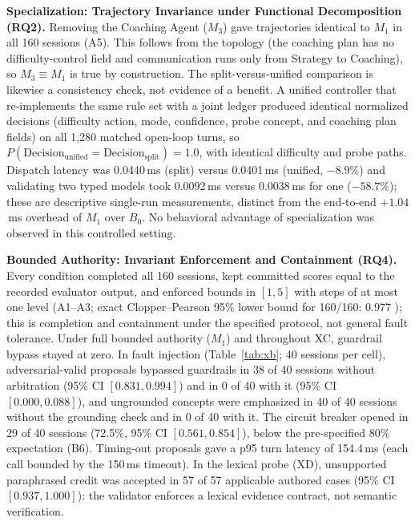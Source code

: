 \documentclass[runningheads,a4paper]{llncs}
\begin{document}
\textbf{Specialization: Trajectory Invariance under Functional Decomposition (RQ2).} Removing the Coaching Agent ($M_3$) gave trajectories identical to $M_1$ in all 160 sessions (A5). This follows from the topology (the coaching plan has no difficulty-control field and communication runs only from Strategy to Coaching), so $M_3\equiv M_1$ is true by construction. The split-versus-unified comparison is likewise a consistency check, not evidence of a benefit. A unified controller that re-implements the same rule set with a joint ledger produced identical normalized decisions (difficulty action, mode, confidence, probe concept, and coaching plan fields) on all 1,280 matched open-loop turns, so $P(\mathrm{Decision}_{\mathrm{unified}}=\mathrm{Decision}_{\mathrm{split}})=1.0$, with identical difficulty and probe paths. Dispatch latency was 0.0440\,ms (split) versus 0.0401\,ms (unified, $-8.9\%$) and validating two typed models took 0.0092\,ms versus 0.0038\,ms for one ($-58.7\%$); these are descriptive single-run measurements, distinct from the end-to-end $+1.04$\,ms overhead of $M_1$ over $B_0$. No behavioral advantage of specialization was observed in this controlled setting.

\textbf{Bounded Authority: Invariant Enforcement and Containment (RQ4).} Every condition completed all 160 sessions, kept committed scores equal to the recorded evaluator output, and enforced bounds in $[1,5]$ with steps of at most one level (A1--A3; exact Clopper--Pearson 95\% lower bound for 160/160: 0.977 \cite{clopper1934}); this is completion and containment under the specified protocol, not general fault tolerance. Under full bounded authority ($M_1$) and throughout XC, guardrail bypass stayed at zero. In fault injection (Table~\ref{tab:xb}; 40 sessions per cell), adversarial-valid proposals bypassed guardrails in 38 of 40 sessions without arbitration (95\% CI $[0.831,0.994]$) and in 0 of 40 with it (95\% CI $[0.000,0.088]$), and ungrounded concepts were emphasized in 40 of 40 sessions without the grounding check and in 0 of 40 with it. The circuit breaker opened in 29 of 40 sessions (72.5\%, 95\% CI $[0.561,0.854]$), below the pre-specified 80\% expectation (B6). Timing-out proposals gave a p95 turn latency of 154.4\,ms (each call bounded by the 150\,ms timeout). In the lexical probe (XD), unsupported paraphrased credit was accepted in 57 of 57 applicable authored cases (95\% CI $[0.937,1.000]$): the validator enforces a lexical evidence contract, not semantic verification.
\end{document}
